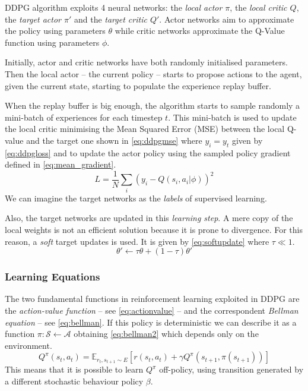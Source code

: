 DDPG algorithm exploits 4 neural networks: the \textit{local actor $\pi$}, the \textit{local critic $Q$}, the \textit{target actor $\pi'$} and the \textit{target critic $Q'$}.
Actor networks aim to approximate the policy using parameters $\theta$ while critic networks approximate the Q-Value function using parameters $\phi$.

Initially, actor and critic networks have both randomly initialised parameters.
Then the local actor -- the current policy -- starts to propose actions to the agent, given the current state, starting to populate the experience replay buffer.

When the replay buffer is big enough, the algorithm starts to sample randomly a mini-batch of experiences for each timestep $t$.
This mini-batch is used to update the local critic minimising the Mean Squared Error (MSE) between the local Q-value and the target one shown in \vref{eq:ddpgmse} where $y_i = y_t$ given by \vref{eq:ddpgloss} and to update the actor policy using the sampled policy gradient defined in \vref{eq:mean_gradient}.
\begin{equation}\label{eq:ddpgmse}
	L = \frac{1}{N} \sum_i(y_i -Q(s_i, a_i|\phi))^2
\end{equation}
We can imagine the target networks as the \textit{labels} of supervised learning.

Also, the target networks are updated in this \textit{learning step}.
A mere copy of the local weights is not an efficient solution because it is prone to divergence.
For this reason, a \textit{soft} target updates is used.
It is given by \vref{eq:softupdate} where $\tau \ll 1$.
\begin{equation} \label{eq:softupdate}
	\theta' \leftarrow \tau \theta + (1-\tau)\theta'
\end{equation}

\subsubsection{Learning Equations}

The two fundamental functions in reinforcement learning exploited in DDPG are the \textit{action-value function} -- see \vref{eq:actionvalue} -- and the correspondent \textit{Bellman equation} -- see \vref{eq:bellman}.
If this policy is deterministic we can describe it as a function $ \pi : \mathcal{S} \leftarrow \mathcal{A}$ obtaining \vref{eq:bellman2} which depends only on the environment.
\begin{equation}\label{eq:bellman2}
	Q^\pi(s_t, a_t) = \mathbb{E}_{r_t,s_{t+1}\sim \mathit{E}}[r(s_t, a_t) + \gamma Q^\pi(s_{t+1}, \pi(s_{t+1}))]
\end{equation}
This means that it is possible to learn $Q^\pi$ off-policy, using transition generated by a different stochastic behaviour policy $\beta$.

